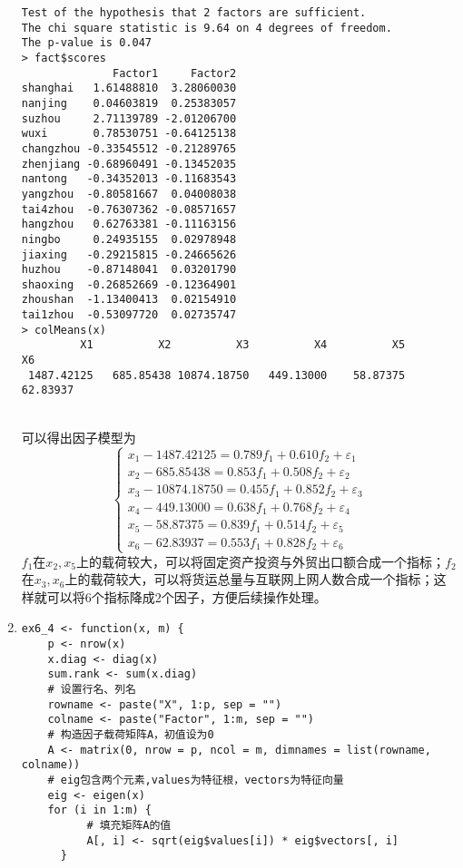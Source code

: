 \begin{enumerate}
\begin{lstlisting}
Test of the hypothesis that 2 factors are sufficient.
The chi square statistic is 9.64 on 4 degrees of freedom.
The p-value is 0.047 
> fact$scores
              Factor1     Factor2
shanghai   1.61488810  3.28060030
nanjing    0.04603819  0.25383057
suzhou     2.71139789 -2.01206700
wuxi       0.78530751 -0.64125138
changzhou -0.33545512 -0.21289765
zhenjiang -0.68960491 -0.13452035
nantong   -0.34352013 -0.11683543
yangzhou  -0.80581667  0.04008038
tai4zhou  -0.76307362 -0.08571657
hangzhou   0.62763381 -0.11163156
ningbo     0.24935155  0.02978948
jiaxing   -0.29215815 -0.24665626
huzhou    -0.87148041  0.03201790
shaoxing  -0.26852669 -0.12364901
zhoushan  -1.13400413  0.02154910
tai1zhou  -0.53097720  0.02735747
> colMeans(x)
         X1          X2          X3          X4          X5          X6 
 1487.42125   685.85438 10874.18750   449.13000    58.87375    62.83937 
\end{lstlisting}
        \summary\\
        可以得出因子模型为
        \[\begin{cases}
            x_1 - 1487.42125 = 0.789f_1 + 0.610f_2 + \varepsilon_1\\
            x_2 - 685.85438 = 0.853f_1 + 0.508f_2 + \varepsilon_2\\
            x_3 - 10874.18750 = 0.455f_1 + 0.852f_2 + \varepsilon_3\\
            x_4 - 449.13000 = 0.638f_1 + 0.768f_2 + \varepsilon_4\\
            x_5 - 58.87375 = 0.839f_1 + 0.514f_2 + \varepsilon_5\\
            x_6 - 62.83937 = 0.553f_1 + 0.828f_2 + \varepsilon_6
            \end{cases}\]
        $f_1$在$x_2,x_5$上的载荷较大，可以将固定资产投资与外贸出口额合成一个指标；$f_2$在$x_3,x_6$上的载荷较大，可以将货运总量与互联网上网人数合成一个指标；这样就可以将6个指标降成2个因子，方便后续操作处理。
        \item
        \code
\begin{lstlisting}
ex6_4 <- function(x, m) {
    p <- nrow(x)
    x.diag <- diag(x)
    sum.rank <- sum(x.diag)
    # 设置行名、列名
    rowname <- paste("X", 1:p, sep = "")
    colname <- paste("Factor", 1:m, sep = "")
    # 构造因子载荷矩阵A，初值设为0
    A <- matrix(0, nrow = p, ncol = m, dimnames = list(rowname, colname))
    # eig包含两个元素,values为特征根，vectors为特征向量
    eig <- eigen(x)
    for (i in 1:m) {
          # 填充矩阵A的值
          A[, i] <- sqrt(eig$values[i]) * eig$vectors[, i]
      }

\end{lstlisting}
\end{enumerate}
